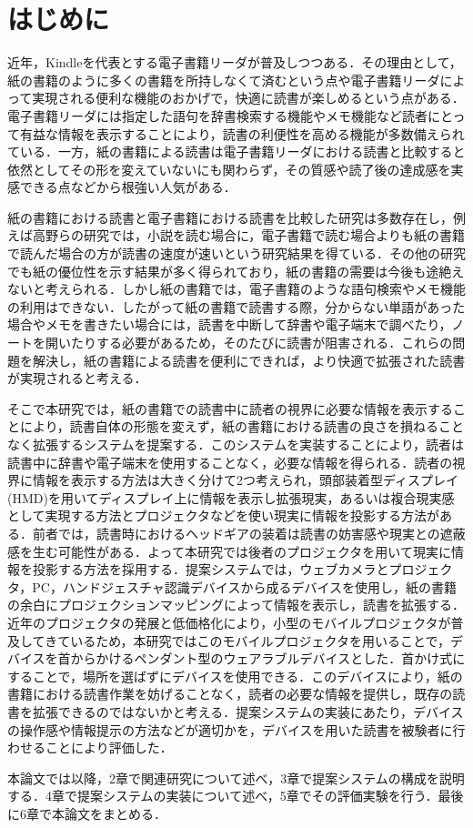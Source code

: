 \section{はじめに}


近年，Kindleを代表とする電子書籍リーダが普及しつつある．その理由として，紙の書籍のように多くの書籍を所持しなくて済むという点や電子書籍リーダによって実現される便利な機能のおかげで，快適に読書が楽しめるという点がある．電子書籍リーダには指定した語句を辞書検索する機能やメモ機能など読者にとって有益な情報を表示することにより，読書の利便性を高める機能が多数備えられている．一方，紙の書籍による読書は電子書籍リーダにおける読書と比較すると依然としてその形を変えていないにも関わらず，その質感や読了後の達成感を実感できる点などから根強い人気がある．

紙の書籍における読書と電子書籍における読書を比較した研究は多数存在し，例えば高野らの研究では，小説を読む場合に，電子書籍で読む場合よりも紙の書籍で読んだ場合の方が読書の速度が速いという研究結果を得ている\cite{takano}．その他の研究でも紙の優位性を示す結果が多く得られており，紙の書籍の需要は今後も途絶えないと考えられる．しかし紙の書籍では，電子書籍のような語句検索やメモ機能の利用はできない．したがって紙の書籍で読書する際，分からない単語があった場合やメモを書きたい場合には，読書を中断して辞書や電子端末で調べたり，ノートを開いたりする必要があるため，そのたびに読書が阻害される．これらの問題を解決し，紙の書籍による読書を便利にできれば，より快適で拡張された読書が実現されると考える．

そこで本研究では，紙の書籍での読書中に読者の視界に必要な情報を表示することにより，読書自体の形態を変えず，紙の書籍における読書の良さを損ねることなく拡張するシステムを提案する．このシステムを実装することにより，読者は読書中に辞書や電子端末を使用することなく，必要な情報を得られる．読者の視界に情報を表示する方法は大きく分けて2つ考えられ，頭部装着型ディスプレイ(HMD)を用いてディスプレイ上に情報を表示し拡張現実，あるいは複合現実感として実現する方法とプロジェクタなどを使い現実に情報を投影する方法がある．前者では，読書時におけるヘッドギアの装着は読書の妨害感や現実との遮蔽感を生む可能性がある．よって本研究では後者のプロジェクタを用いて現実に情報を投影する方法を採用する．提案システムでは，ウェブカメラとプロジェクタ，PC，ハンドジェスチャ認識デバイスから成るデバイスを使用し，紙の書籍の余白にプロジェクションマッピングによって情報を表示し，読書を拡張する．近年のプロジェクタの発展と低価格化により，小型のモバイルプロジェクタが普及してきているため，本研究ではこのモバイルプロジェクタを用いることで，デバイスを首からかけるペンダント型のウェアラブルデバイスとした．首かけ式にすることで，場所を選ばずにデバイスを使用できる．このデバイスにより，紙の書籍における読書作業を妨げることなく，読者の必要な情報を提供し，既存の読書を拡張できるのではないかと考える．提案システムの実装にあたり，デバイスの操作感や情報提示の方法などが適切かを，デバイスを用いた読書を被験者に行わせることにより評価した．


本論文では以降，2章で関連研究について述べ，3章で提案システムの構成を説明する．4章で提案システムの実装について述べ，5章でその評価実験を行う．最後に6章で本論文をまとめる．

